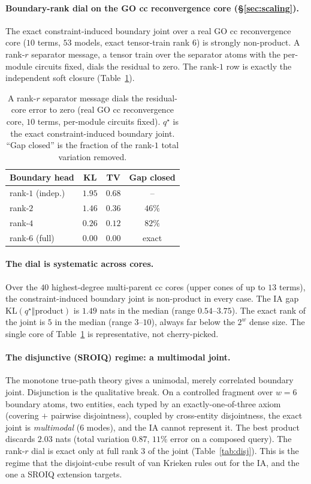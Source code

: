 \documentclass[letterpaper]{article}
\begin{document}
\paragraph{Boundary-rank dial on the GO cc reconvergence core (\S\ref{sec:scaling}).}
The exact constraint-induced boundary joint over a real GO cc reconvergence core ($10$ terms, $53$ models, exact tensor-train rank $6$) is strongly non-product. A rank-$r$ separator message, a tensor train over the separator atoms with the per-module circuits fixed, dials the residual to zero. The rank-$1$ row is exactly the independent soft closure (Table~\ref{tab:rank}).

\begin{table}[t]\centering
\caption{A rank-$r$ separator message dials the residual-core error to zero (real GO cc reconvergence core, $10$ terms, per-module circuits fixed). $q^\star$ is the exact constraint-induced boundary joint. ``Gap closed'' is the fraction of the rank-$1$ total variation removed.}\label{tab:rank}
\footnotesize
\setlength{\tabcolsep}{3pt}
\begin{tabular}{@{}lccc@{}}
\toprule
Boundary head & KL & TV & Gap closed\\
\midrule
rank-$1$ (indep.) & $1.95$ & $0.68$ & -- \\
rank-$2$ & $1.46$ & $0.36$ & $46\%$\\
rank-$4$ & $0.26$ & $0.12$ & $82\%$\\
rank-$6$ (full) & $0.00$ & $0.00$ & exact\\
\bottomrule
\end{tabular}
\end{table}

\paragraph{The dial is systematic across cores.}
Over the $40$ highest-degree multi-parent cc cores (upper cones of up to $13$ terms), the
constraint-induced boundary joint is non-product in every case. The IA gap
$\mathrm{KL}(q^\star\Vert\text{product})$ is $1.49$ nats in the median (range $0.54$--$3.75$).
The exact rank of the joint is $5$ in the median (range $3$--$10$), always far below the $2^{w}$
dense size. The single core of Table~\ref{tab:rank} is representative, not cherry-picked.

\paragraph{The disjunctive (SROIQ) regime: a multimodal joint.}
The monotone true-path theory gives a unimodal, merely correlated boundary joint. Disjunction is the
qualitative break. On a controlled fragment over $w{=}6$ boundary atoms, two entities, each typed by
an exactly-one-of-three axiom (covering $+$ pairwise disjointness), coupled by cross-entity
disjointness, the exact joint is \emph{multimodal} ($6$ modes), and the IA cannot represent it.
The best product discards $2.03$ nats (total variation $0.87$, $11\%$ error on a composed query). The
rank-$r$ dial is exact only at full rank $3$ of the joint (Table~\ref{tab:disj}). This is the
regime that the disjoint-cube result of van Krieken rules out for the IA, and the one a SROIQ extension targets.
\end{document}
